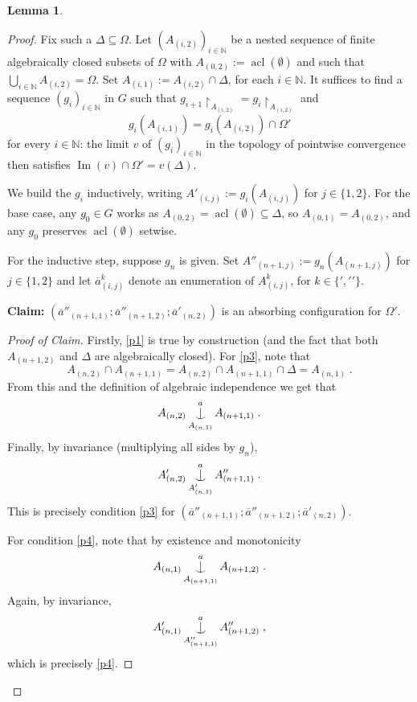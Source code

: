 \documentclass{article}
\newtheorem{lemma}[theorem]{Lemma}
\theoremstyle{remark}
\theoremstyle{definition}
\DeclareMathOperator{\acl}{acl}
\DeclareMathOperator{\im}{Im}
\def\Ind#1#2{#1\setbox0=\hbox{$#1x$}\kern\wd0\hbox to 0pt{\hss$#1\mid$\hss}
	\lower.9\ht0\hbox to 0pt{\hss$#1\smile$\hss}\kern\wd0}
\def\ind{\mathop{\mathpalette\Ind{}}}
\newcommand*{\greysquare}{\textcolor{gray}{\blacksquare}}
\newenvironment{subproof}[1][\proofname]{%
\renewcommand{\qedsymbol}{$\greysquare$}%
\begin{proof}[#1]%
	}{%
\end{proof}%
}
\begin{document}
{{{{{\begin{lemma}
 
  \end{lemma}

  \begin{proof}
 Fix such a $\Delta\subseteq\Omega$. Let $(A_{(i,2)})_{i\in\mathbb{N}}$ be a nested sequence of finite algebraically closed subsets of $\Omega$ with %
 { $A_{(0,2)} := \acl(\emptyset)$}
 and such that $\bigcup_{i\in\mathbb{N}} A_{(i,2)}=\Omega$. Set
  $A_{(i,1)} := A_{(i,2)} \cap \Delta$, for each $i\in\mathbb{N}$. %
  {It suffices to find a sequence
  $(g_i)_{i \in \mathbb{N}}$ in $G$ such that
  $g_{i+1} \upharpoonright_{A_{(i,2)}} = g_i \upharpoonright_{A_{(i,2)}}$ and
  \begin{equation}\label{eq: want for gi}
    g_i(A_{(i,1)}) = g_i(A_{(i,2)}) \cap \Omega'
  \end{equation}
  for every $i\in \mathbb N$: the limit $v$ of $(g_i)_{i\in \mathbb N}$ in the topology of pointwise
  convergence then satisfies $\im(v) \cap \Omega' = v(\Delta)$.}


{  We build the $g_i$ inductively, writing $A'_{(i,j)} := g_i(A_{(i,j)})$ for   $j \in \{1, 2\}$. %
For the base case, any   $g_0 \in G$ works as $A_{(0,2)} = \acl(\emptyset) \subseteq \Delta$, so  $A_{(0,1)} = A_{(0,2)}$, and any 
  $g_0$ preserves $\acl(\emptyset)$ setwise.} 

{ For the inductive step, suppose $g_n$ is given. Set
  $A''_{(n+1,j)} := g_n(A_{(n+1,j)})$ for $j \in \{1,2\}$ and let $\overline{a}^{k}_{(i,j)}$ denote an enumeration of  $A^{k}_{(i,j)}$, for $k \in \{\prime, \prime\prime\}$.}
  
\textbf{Claim:} $(\overline{a}''_{(n+1, 1)}; \overline{a}''_{(n+1, 2)}; \overline{a}'_{(n,2)})$ is an absorbing configuration for $\Omega'$.
\begin{subproof}[Proof of Claim] Firstly, \ref{p1} is true by construction (and the fact that both ${A_{(n+1, 2)}}$
and $\Delta$ are algebraically closed). For \ref{p3}, note that
\[A_{(n,2)}\cap A_{(n+1, 1)}=A_{(n,2)}\cap A_{(n+1, 1)}\cap\Delta=A_{(n,1)}\;.\]
From this and the definition of algebraic independence we get that 
\[A_{(n,2)}\ind^{a}_{A_{(n,1)}} A_{(n+1, 1)}\;.\]
Finally, by invariance (multiplying all sides by {$g_n$}), 
\[A'_{(n,2)}\ind^{a}_{A'_{(n,1)}} A''_{(n+1, 1)}\;.\]
This is precisely condition \ref{p3} for $(\overline{a}''_{(n+1, 1)}; \overline{a}''_{(n+1, 2)}; \overline{a}'_{(n,2)})$.

For condition \ref{p4}, note that by %
{existence} and monotonicity
\[A_{(n,1)}\ind^{a}_{A_{(n+1, 1)}} A_{(n+1, 2)}\;.\]
Again, by invariance, 
\[A'_{(n,1)}\ind^{a}_{A''_{(n+1, 1)}} A''_{(n+1, 2)}\;,\]
which is precisely \ref{p4}.
\end{subproof}


\end{proof}}}}}}
\end{document}

